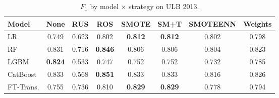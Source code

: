 \begin{table}[ht!]
\centering
\caption{$F_1$ by model $\times$ strategy on ULB 2013.}
\label{tab:factorial_ulb_f1}
\begin{tabular}{l c c c c c c c}
\toprule
Model & None & RUS & ROS & SMOTE & SM+T & SMOTEENN & Weights \\
\midrule
LR         & 0.749 & 0.623 & 0.802 & \textbf{0.812} & \textbf{0.812} & 0.802 & 0.798 \\
RF         & 0.831 & 0.716 & \textbf{0.846} & 0.806 & 0.806 & 0.804 & 0.823 \\
LGBM       & \textbf{0.824} & 0.533 & 0.747 & 0.752 & 0.752 & 0.732 & 0.785 \\
CatBoost   & 0.833 & 0.568 & \textbf{0.851} & 0.833 & 0.833 & 0.816 & 0.826 \\
FT-Trans.  & 0.755 & 0.736 & 0.810 & \textbf{0.829} & \textbf{0.829} & 0.778 & 0.794 \\
\bottomrule
\end{tabular}
\end{table}